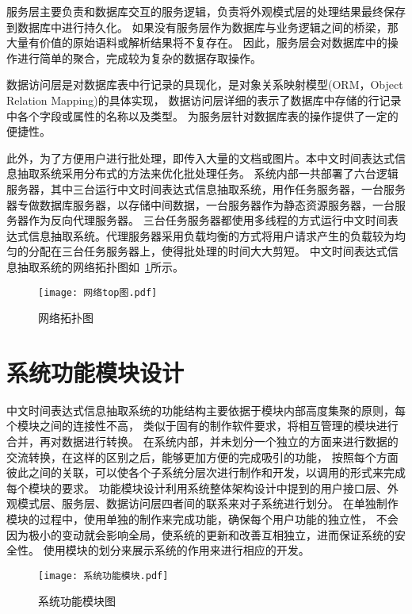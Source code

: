 服务层主要负责和数据库交互的服务逻辑，负责将外观模式层的处理结果最终保存到数据库中进行持久化。
如果没有服务层作为数据库与业务逻辑之间的桥梁，那大量有价值的原始语料或解析结果将不复存在。
因此，服务层会对数据库中的操作进行简单的聚合，完成较为复杂的数据存取操作。

数据访问层是对数据库表中行记录的具现化，是对象关系映射模型(ORM，Object Relation Mapping)的具体实现，
数据访问层详细的表示了数据库中存储的行记录中各个字段或属性的名称以及类型。
为服务层针对数据库表的操作提供了一定的便捷性。

此外，为了方便用户进行批处理，即传入大量的文档或图片。本中文时间表达式信息抽取系统采用分布式的方法来优化批处理任务。
系统内部一共部署了六台逻辑服务器，其中三台运行中文时间表达式信息抽取系统，用作任务服务器，一台服务器专做数据库服务器，以存储中间数据，一台服务器作为静态资源服务器，一台服务器作为反向代理服务器。
三台任务服务器都使用多线程的方式运行中文时间表达式信息抽取系统。代理服务器采用负载均衡的方式将用户请求产生的负载较为均匀的分配在三台任务服务器上，使得批处理的时间大大剪短。
中文时间表达式信息抽取系统的网络拓扑图如~\ref{fig:network_top}所示。

\begin{figure}[h]
  \centering
  \texttt{[image: 网络top图.pdf]}
  \caption{网络拓扑图}
  \label{fig:network_top}
\end{figure}

\section{系统功能模块设计}

中文时间表达式信息抽取系统的功能结构主要依据于模块内部高度集聚的原则，每个模块之间的连接性不高，
类似于固有的制作软件要求，将相互管理的模块进行合并，再对数据进行转换。
在系统内部，并未划分一个独立的方面来进行数据的交流转换，在这样的区别之后，能够更加方便的完成吸引的功能，
按照每个方面彼此之间的关联，可以使各个子系统分层次进行制作和开发，以调用的形式来完成每个模块的要求。
功能模块设计利用系统整体架构设计中提到的用户接口层、外观模式层、服务层、数据访问层四者间的联系来对子系统进行划分。
在单独制作模块的过程中，使用单独的制作来完成功能，确保每个用户功能的独立性，
不会因为极小的变动就会影响全局，使系统的更新和改善互相独立，进而保证系统的安全性。
使用模块的划分来展示系统的作用来进行相应的开发。

\begin{figure}[h]
  \centering
  \texttt{[image: 系统功能模块.pdf]}
  \caption{系统功能模块图}
  \label{fig:system_feature}
\end{figure}

